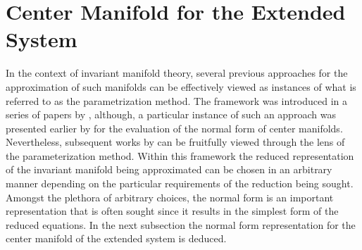 \section{Center Manifold for the Extended System}
\label{sec:center_manifold_derivation}

In the context of invariant manifold theory, several previous approaches for the approximation of such manifolds can be effectively viewed  as instances of what is referred to as the parametrization method. The framework was introduced in a series of papers by \citet{cabre03a,cabre03b,cabre05}, although, a particular instance of such an approach was presented earlier by \citet{coullet83} for the evaluation of the normal form of center manifolds. Nevertheless, subsequent works by \citet{carini15,jain22,vizzaccaro22,negi24} can be fruitfully viewed through the lens of the parameterization method. Within this framework the reduced representation of the invariant manifold being approximated can be chosen in an arbitrary manner depending on the particular requirements of the reduction being sought. Amongst the plethora of arbitrary choices, the normal form is an important representation that is often sought since it results in the simplest form of the reduced equations. In the next subsection the normal form representation for the center manifold of the extended system is deduced. 


